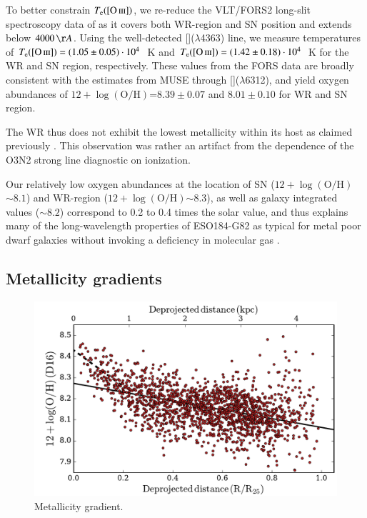 \documentclass[traditabstract]{aa}
\newcommand{\oh}{$12+\log(\mathrm{O/H})$}
\newcommand{\siii}{[\ion{S}{iii}]}
\newcommand{\oiii}{[\ion{O}{iii}]}
\begin{document}
To better constrain $T_{\mathrm{e}}(\oiii)$, we re-reduce the VLT/FORS2 long-slit spectroscopy data of \citet{2006A&A...454..103H} as it covers both WR-region and SN position and extends below $4000\,\AA$. Using the well-detected \oiii($\lambda$4363) line, we measure temperatures of $T_{\mathrm{e}}(\oiii)=(1.05\pm0.05)\cdot 10^{4}$~K and $T_{\mathrm{e}}(\oiii)=(1.42\pm0.18)\cdot10^{4}$~K for the WR and SN region, respectively. These values from the FORS data are broadly consistent with the estimates from MUSE through \siii($\lambda$6312), and yield oxygen abundances of \oh=$8.39\pm0.07$ and $8.01\pm0.10$ for WR and SN region. 

The WR thus does not exhibit the lowest metallicity within its host as claimed previously \citep{2008A&A...490...45C}. This observation was rather an artifact from the dependence of the O3N2 strong line diagnostic on ionization.

Our relatively low oxygen abundances at the location of SN (\oh$\sim8.1$) and WR-region (\oh$\sim8.3$), as well as galaxy integrated values ($\sim8.2$) correspond to 0.2 to 0.4 times the solar value, and thus explains many of the long-wavelength properties of ESO184-G82 as typical for metal poor dwarf galaxies without invoking a deficiency in molecular gas \citep{2016arXiv160901742M}.


\subsection{Metallicity gradients}
\label{sec:metgrad}

\begin{figure}
\includegraphics[angle=0, width=0.99\columnwidth]{Figs/MUSE_SN1998bw_metgrad.pdf}
\caption{Metallicity gradient.}
\label{fig:metgrad}
\end{figure}
\end{document}
